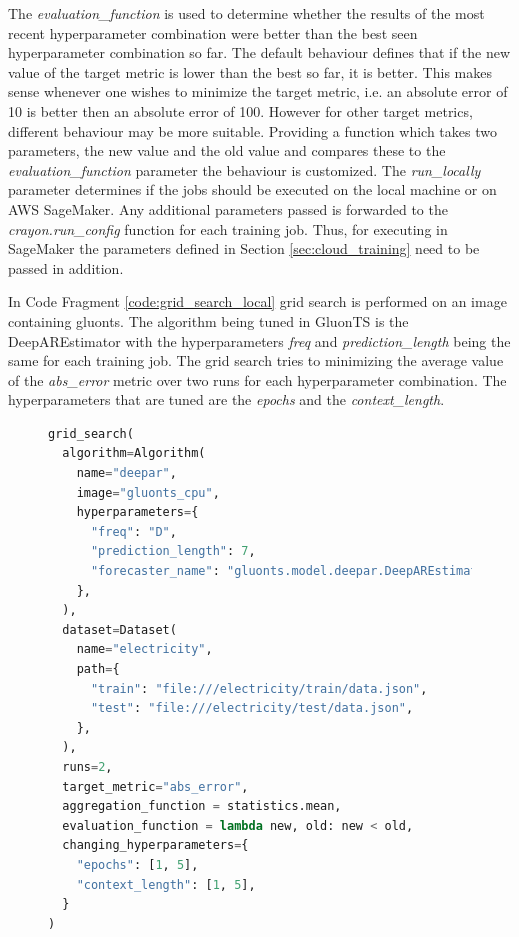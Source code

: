 The \textit{evaluation\_function} is used to determine whether the results of the most recent hyperparameter combination were better than the best seen hyperparameter combination so far. The default behaviour defines that if the new value of the target metric is lower than the best so far, it is better. This makes sense whenever one wishes to minimize the target metric, i.e. an absolute error of 10 is better then an absolute error of 100. However for other target metrics, different behaviour may be more suitable. Providing a function which takes two parameters, the new value and the old value and compares these to the \textit{evaluation\_function} parameter the behaviour is customized. The \textit{run\_locally} parameter determines if the jobs should be executed on the local machine or on AWS SageMaker. Any additional parameters passed is forwarded to the \textit{crayon.run\_config} function for each training job. Thus, for executing in SageMaker the parameters defined in Section \ref{sec:cloud_training} need to be passed in addition.

In Code Fragment \ref{code:grid_search_local} grid search is performed on an image containing gluonts. The algorithm being tuned in GluonTS is the DeepAREstimator with the hyperparameters \textit{freq} and \textit{prediction\_length} being the same for each training job. The grid search tries to minimizing the average value of the \textit{abs\_error} metric over two runs for each hyperparameter combination. The hyperparameters that are tuned are the \textit{epochs} and the \textit{context\_length}.
\begin{figure}
  \begin{lstlisting}[language=Python, label={code:grid_search_local}, caption={Grid search running locally.}]
grid_search(
  algorithm=Algorithm(
    name="deepar",
    image="gluonts_cpu",
    hyperparameters={
      "freq": "D",
      "prediction_length": 7,
      "forecaster_name": "gluonts.model.deepar.DeepAREstimator",
    },
  ),
  dataset=Dataset(
    name="electricity",
    path={
      "train": "file:///electricity/train/data.json",
      "test": "file:///electricity/test/data.json",
    },
  ),
  runs=2,
  target_metric="abs_error",
  aggregation_function = statistics.mean, 
  evaluation_function = lambda new, old: new < old,
  changing_hyperparameters={
    "epochs": [1, 5],
    "context_length": [1, 5],
  }
)
  \end{lstlisting}
\end{figure}



